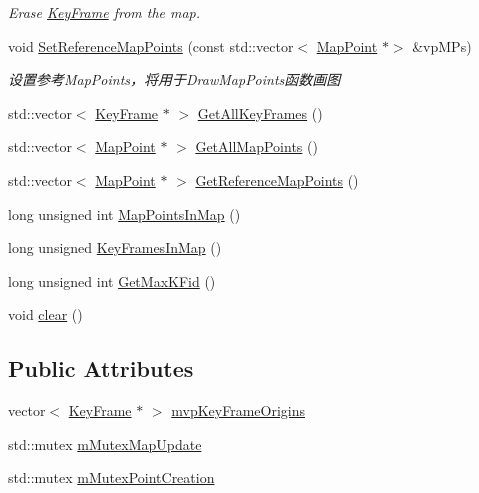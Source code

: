 \begin{DoxyCompactItemize}
\begin{DoxyCompactList}\small\item\em Erase \mbox{\hyperlink{class_o_r_b___s_l_a_m2_1_1_key_frame}{Key\+Frame}} from the map. \end{DoxyCompactList}\item 
void \mbox{\hyperlink{class_o_r_b___s_l_a_m2_1_1_map_ac31706152aeb99c94ddb7f6ce452bd77}{Set\+Reference\+Map\+Points}} (const std\+::vector$<$ \mbox{\hyperlink{class_o_r_b___s_l_a_m2_1_1_map_point}{Map\+Point}} $\ast$$>$ \&vp\+M\+Ps)
\begin{DoxyCompactList}\small\item\em 设置参考\+Map\+Points，将用于\+Draw\+Map\+Points函数画图 \end{DoxyCompactList}\item 
std\+::vector$<$ \mbox{\hyperlink{class_o_r_b___s_l_a_m2_1_1_key_frame}{Key\+Frame}} $\ast$ $>$ \mbox{\hyperlink{class_o_r_b___s_l_a_m2_1_1_map_a8cde12cda887a0eb1e24975f4e734592}{Get\+All\+Key\+Frames}} ()
\item 
std\+::vector$<$ \mbox{\hyperlink{class_o_r_b___s_l_a_m2_1_1_map_point}{Map\+Point}} $\ast$ $>$ \mbox{\hyperlink{class_o_r_b___s_l_a_m2_1_1_map_a09f346e647d3d36ec644f96d878b0c9b}{Get\+All\+Map\+Points}} ()
\item 
std\+::vector$<$ \mbox{\hyperlink{class_o_r_b___s_l_a_m2_1_1_map_point}{Map\+Point}} $\ast$ $>$ \mbox{\hyperlink{class_o_r_b___s_l_a_m2_1_1_map_a56e1d96a4e1d669609e2c2a493f133c2}{Get\+Reference\+Map\+Points}} ()
\item 
long unsigned int \mbox{\hyperlink{class_o_r_b___s_l_a_m2_1_1_map_ad2d7846734c8cb0421d67ff3907649ad}{Map\+Points\+In\+Map}} ()
\item 
long unsigned \mbox{\hyperlink{class_o_r_b___s_l_a_m2_1_1_map_a3440f5e9e93ca7231bde3c5138ab5f5c}{Key\+Frames\+In\+Map}} ()
\item 
long unsigned int \mbox{\hyperlink{class_o_r_b___s_l_a_m2_1_1_map_a1c93202df313c1245056e01dbb070dca}{Get\+Max\+K\+Fid}} ()
\item 
void \mbox{\hyperlink{class_o_r_b___s_l_a_m2_1_1_map_abf0d75e6e234d89b06f568c4600d0436}{clear}} ()
\end{DoxyCompactItemize}
\subsection*{Public Attributes}
\begin{DoxyCompactItemize}
\item 
vector$<$ \mbox{\hyperlink{class_o_r_b___s_l_a_m2_1_1_key_frame}{Key\+Frame}} $\ast$ $>$ \mbox{\hyperlink{class_o_r_b___s_l_a_m2_1_1_map_a9617fdf1c8349a1bf88bb13c20acf160}{mvp\+Key\+Frame\+Origins}}
\item 
std\+::mutex \mbox{\hyperlink{class_o_r_b___s_l_a_m2_1_1_map_a05544c09b3227d31163f10609b90b913}{m\+Mutex\+Map\+Update}}
\item 
std\+::mutex \mbox{\hyperlink{class_o_r_b___s_l_a_m2_1_1_map_a968356226057387d8207054d56e5d35c}{m\+Mutex\+Point\+Creation}}
\end{DoxyCompactItemize}
